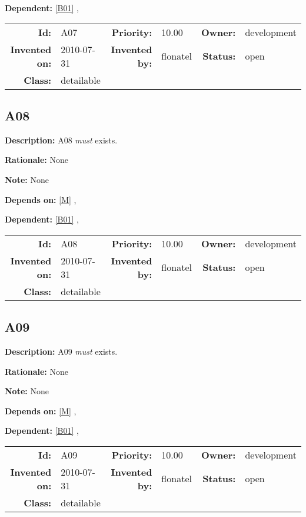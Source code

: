 \textbf{Dependent:} \ref{B01} , 

\par
{\small \begin{center}\begin{tabular}{rlrlrl}
\textbf{Id:} & A07 & \textbf{Priority:} & 10.00 & \textbf{Owner:} & development \\ 
\textbf{Invented on:} & 2010-07-31 & \textbf{Invented by:} & flonatel & \textbf{Status:} & open \\ 
\textbf{Class:} & detailable & & & & \\ 
\end{tabular}\end{center} }%
\subsection{A08}\label{A08}
\textbf{Description:} A08 \textsl{must} exists.

\textbf{Rationale:} None

\textbf{Note:} None

\textbf{Depends on:} \ref{M} , 

\textbf{Dependent:} \ref{B01} , 

\par
{\small \begin{center}\begin{tabular}{rlrlrl}
\textbf{Id:} & A08 & \textbf{Priority:} & 10.00 & \textbf{Owner:} & development \\ 
\textbf{Invented on:} & 2010-07-31 & \textbf{Invented by:} & flonatel & \textbf{Status:} & open \\ 
\textbf{Class:} & detailable & & & & \\ 
\end{tabular}\end{center} }%
\subsection{A09}\label{A09}
\textbf{Description:} A09 \textsl{must} exists.

\textbf{Rationale:} None

\textbf{Note:} None

\textbf{Depends on:} \ref{M} , 

\textbf{Dependent:} \ref{B01} , 

\par
{\small \begin{center}\begin{tabular}{rlrlrl}
\textbf{Id:} & A09 & \textbf{Priority:} & 10.00 & \textbf{Owner:} & development \\ 
\textbf{Invented on:} & 2010-07-31 & \textbf{Invented by:} & flonatel & \textbf{Status:} & open \\ 
\textbf{Class:} & detailable & & & & \\ 
\end{tabular}\end{center} }%
